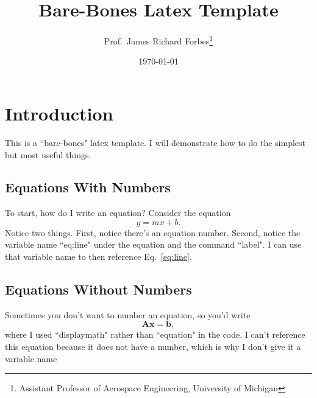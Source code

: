 \documentclass[11pt]{article}
\title{ Bare-Bones Latex Template }
\author{Prof.\ James Richard Forbes\thanks{Assistant Professor of Aerospace Engineering, University of Michigan}}
\date{\today}
\begin{document}
\maketitle

\section{Introduction}

This is a ``bare-bones" latex template. I will demonstrate how to do the simplest but most useful things. 

\subsection{Equations With Numbers}

To start, how do I write an equation? Consider the equation
%
\begin{equation}
	y = m x + b .
	\label{eq:line}
\end{equation}
%
Notice two things. First, notice there's an equation number. Second, notice the variable name ``{eq:line}" under the equation and the command ``label". I can use that variable name to then reference Eq.~\eqref{eq:line}.

\subsection{Equations Without Numbers}
\label{sec:eqs_without_nums}

Sometimes you don't want to number an equation, so you'd write
%
\begin{displaymath}
	\textbf{A} \textbf{x} = \textbf{b} ,
\end{displaymath}
%
where I used ``displaymath" rather than ``equation" in the code. I can't reference this equation because it does not have a number, which is why I don't give it a variable name 
\end{document}
